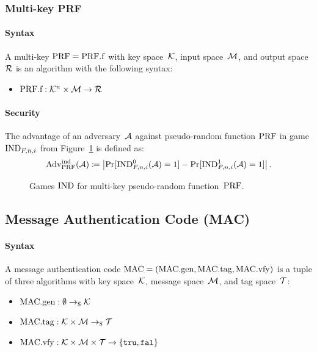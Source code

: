 \documentclass[a4paper,orivec]{llncs}
\begin{document}
\subsubsection{Multi-key PRF}
\paragraph{Syntax} A multi-key $\mathrm{PRF}=\mathrm{PRF}.\mathrm{f}$ with key space~$\mathcal{K}$, input space~$\mathcal{M}$, and output space~$\mathcal{R}$ is an algorithm with the following syntax:

\begin{itemize}
    \item $\mathrm{PRF}.\mathrm{f}: \mathcal{K}^n\times\mathcal{M} \to \mathcal{R}$
\end{itemize}

\paragraph{Security}
The advantage of an adversary~$\mathcal{A}$ against pseudo-random function $\mathrm{PRF}$ in game ${\mathrm{IND}}_{F,n,i}$ from Figure~\ref{fig:prf:multi_key:ind} is defined as:
\[
\mathrm{Adv}_{\mathrm{PRF}}^{\mathrm{ind}}(\mathcal{A})\coloneqq\left|\Pr[{\mathrm{IND}}_{F,n,i}^0(\mathcal{A})=1]-\Pr[{\mathrm{IND}}_{F,n,i}^1(\mathcal{A})=1]\right|\text{.}
\]


\begin{figure}[!ht]
    \centering
    \nicoresetlinenr%
    \fbox{%
        \scalebox{\codescalefactor}{%
        }%
    }
    \caption{%
        Games ${\mathrm{IND}}$ for multi-key pseudo-random function~$\mathrm{PRF}$.
    }
    \label{fig:prf:multi_key:ind}
\end{figure}

\subsection{Message Authentication Code (MAC)}

\paragraph{Syntax}
A message authentication code $\mathrm{MAC}=(\mathrm{MAC}.\mathrm{gen},\mathrm{MAC}.\mathrm{tag},\mathrm{MAC}.\mathrm{vfy})$ is a tuple of three algorithms with key space~$\mathcal{K}$, message space~$\mathcal{M}$, and tag space~$\mathcal{T}$:

\begin{itemize}
    \item $\mathrm{MAC}.\mathrm{gen}: \emptyset \to_\$ \mathcal{K}$
    \item $\mathrm{MAC}.\mathrm{tag}: \mathcal{K}\times\mathcal{M} \to_\$ \mathcal{T}$
    \item $\mathrm{MAC}.\mathrm{vfy}: \mathcal{K}\times\mathcal{M}\times\mathcal{T} \to \{\mathtt{tru},\mathtt{fal}\}$
\end{itemize}
\end{document}
